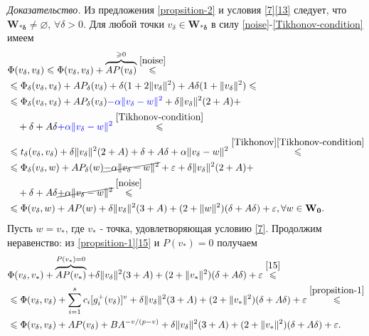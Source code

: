 \noindent\emph{Доказательство.} Из предложения \ref{propsition-2} и условия \eqref{7}\eqref{13} следует, что $\mathbf{W_{*\delta}}\ne\varnothing$, $\forall\delta >0.$ Для любой точки $v_{\delta}\in\mathbf{W_{*\delta}}$ в силу \eqref{noise}-\eqref{Tikhonov-condition} имеем
\begin{equation}
\label{18}
\begin{aligned}
&\Phi(v_{\delta},v_{\delta})\leqslant \Phi(v_{\delta},v_{\delta})+\overbrace{AP(v_{\delta})}^{\geqslant 0}\stackrel{\eqref{noise}}{\leqslant}\\
&\leqslant\Phi_{\delta}(v_{\delta},v_{\delta})+AP_{\delta}(v_{\delta})+\delta(1+2\|v_{\delta}\|^2)+A\delta(1+\|v_\delta\|^2)\leqslant\\
&\leqslant\Phi_{\delta}(v_{\delta},v_{\delta})+AP_{\delta}(v_{\delta})\textcolor{blue}{-\alpha\|v_{\delta}-w\|^2}+\delta\|v_{\delta}\|^2(2+A)+\\
&\quad +\delta+A\delta\textcolor{blue}{+\alpha\|v_{\delta}-w\|^2}\stackrel{\eqref{Tikhonov-condition}}{\leqslant}\\
&\leqslant t_{\delta}(v_{\delta},v_{\delta})+\delta\|v_{\delta}\|^2(2+A)+\delta+A\delta+\alpha\|v_{\delta}-w\|^2\stackrel{\eqref{Tikhonov}\eqref{Tikhonov-condition}}{\leqslant}\\
&\leqslant \Phi_{\delta}(v_{\delta},w)+AP_{\delta}(w)\cancel{-\alpha\|v_{\delta}-w\|^2}+\varepsilon+\delta\|v_{\delta}\|^2(2+A)+\\
&\quad+\delta+A\delta\cancel{+\alpha\|v_{\delta}-w\|^2}\stackrel{\eqref{noise}}{\leqslant}\\
&\leqslant \Phi(v_{\delta},w)+AP(w)+\delta\|v_{\delta}\|^2(3+A)+(2+\|w\|^2)(\delta+A\delta)+\varepsilon,\forall w\in \mathbf{W_0}.
\end{aligned}
\end{equation}
Пусть $w=v_*$, где $v_*$ - точка, удовлетворяющая условию \eqref{7}. Продолжим неравенство: из \eqref{propsition-1}\eqref{15} и $P(v_*)=0$ получаем
\begin{equation}
\label{18-2}
\begin{aligned}
&\Phi(v_{\delta},v_*)+\overbrace{AP(v_*)}^{ P(v_*)=0}+\delta\|v_{\delta}\|^2(3+A)+(2+\|v_*\|^2)(\delta+A\delta)+\varepsilon\stackrel{\eqref{15}}{\leqslant}\\
&\leqslant \Phi(v_{\delta},v_{\delta})+\sum_{i=1}^{s}c_i[g_i^+(v_{\delta})]^v+\delta\|v_{\delta}\|^2(3+A)+(2+\|v_*\|^2)(\delta+A\delta)+\varepsilon\stackrel{\eqref{propsition-1}}{\leqslant}\\ 
&\leqslant \Phi(v_{\delta},v_{\delta})+AP(v_{\delta})+BA^{-v/(p-v)}+\delta\|v_{\delta}\|^2(3+A)+(2+\|v_*\|^2)(\delta+A\delta)+\varepsilon.
\end{aligned}
\end{equation}
